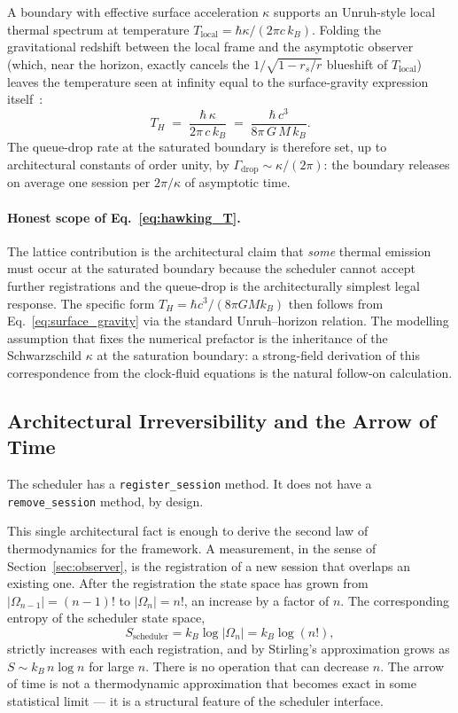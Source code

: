 A boundary with effective surface acceleration $\kappa$ supports an
Unruh-style local thermal spectrum at temperature
$T_\text{local} = \hbar\kappa/(2\pi c\,k_B)$.
Folding the gravitational redshift between the local frame and the
asymptotic observer (which, near the horizon, exactly cancels the
$1/\sqrt{1-r_s/r}$ blueshift of $T_\text{local}$) leaves the
temperature seen at infinity equal to the surface-gravity expression
itself~\cite{hawking1975}:
\begin{equation}
    T_H \;=\; \frac{\hbar\,\kappa}{2\pi\,c\,k_B}
        \;=\; \frac{\hbar\,c^3}{8\pi\,G\,M\,k_B}.
    \label{eq:hawking_T}
\end{equation}
The queue-drop rate at the saturated boundary is therefore set, up
to architectural constants of order unity, by
$\Gamma_\text{drop}\sim \kappa/(2\pi)$: the boundary releases on
average one session per $2\pi/\kappa$ of asymptotic time.

\paragraph{Honest scope of Eq.~\eqref{eq:hawking_T}.}
The lattice contribution is the architectural claim that
\emph{some} thermal emission must occur at the saturated boundary
because the scheduler cannot accept further registrations and the
queue-drop is the architecturally simplest legal response.  The
specific form $T_H = \hbar c^3/(8\pi G M k_B)$ then follows from
Eq.~\eqref{eq:surface_gravity} via the standard Unruh--horizon
relation.  The modelling assumption that fixes the numerical
prefactor is the inheritance of the Schwarzschild $\kappa$ at the
saturation boundary: a strong-field derivation of this
correspondence from the clock-fluid equations is the natural
follow-on calculation.

\subsection{Architectural Irreversibility and the Arrow of Time}
\label{subsec:arrow_of_time}

The scheduler has a \texttt{register\_session} method.
It does not have a \texttt{remove\_session} method, by design.

This single architectural fact is enough to derive the second law of
thermodynamics for the framework.
A measurement, in the sense of Section~\ref{sec:observer}, is the
registration of a new session that overlaps an existing one.
After the registration the state space has grown from $|\Omega_{n-1}| =
(n-1)!$ to $|\Omega_n| = n!$, an increase by a factor of $n$.
The corresponding entropy of the scheduler state space,
\begin{equation}
    S_\text{scheduler} = k_B \log |\Omega_n| = k_B \log(n!),
    \label{eq:scheduler_entropy}
\end{equation}
strictly increases with each registration, and by Stirling's
approximation grows as $S \sim k_B\,n \log n$ for large $n$.
There is no operation that can decrease $n$.
The arrow of time is not a thermodynamic approximation that becomes
exact in some statistical limit --- it is a structural feature of the
scheduler interface.

